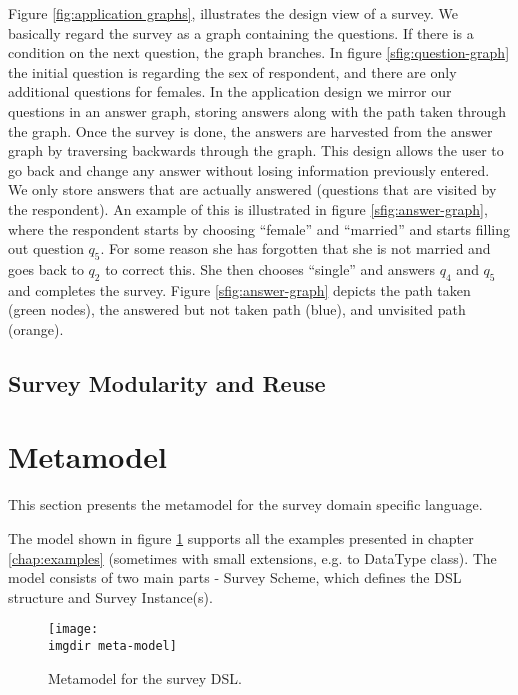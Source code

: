 Figure \ref{fig:application graphs}, illustrates the design view of a survey. We basically regard the survey as a graph containing the questions. If there is a condition on the next question, the graph branches. In figure \ref{sfig:question-graph} the initial question is regarding the sex of respondent, and there are only additional questions for females. In the application design we mirror our questions in an answer graph, storing answers along with the path taken through the graph. Once the survey is done, the answers are harvested from the answer graph by traversing backwards through the graph. This design allows the user to go back and change any answer without losing information previously entered. We only store answers that are actually answered (questions that are visited by the respondent). An example of this is illustrated in figure \ref{sfig:answer-graph}, where the respondent starts by choosing ``female'' and ``married'' and starts filling out question $q_5$. For some reason she has forgotten that she is not married and goes back to $q_2$ to correct this. She then chooses ``single'' and answers $q_4$ and $q_5$ and completes the survey. Figure \ref{sfig:answer-graph} depicts the path taken (green nodes), the answered but not taken path (blue), and unvisited path (orange).

\subsection{Survey Modularity and Reuse}
\label{subsec:modularityandreuse}

\section{Metamodel}
\label{sec:metamodel}
This section presents the metamodel for the survey domain specific language.  

The model shown in figure \ref{fig:metamodel} supports all the examples presented in chapter \ref{chap:examples} (sometimes with small extensions, e.g. to DataType class).
The model consists of two main parts - Survey Scheme, which defines the DSL structure and Survey Instance(s).

\begin{figure}[!htbp]
  \texttt{[image: \\imgdir meta-model]}
  \caption{Metamodel for the survey DSL.}
  \label{fig:metamodel}
\end{figure}

